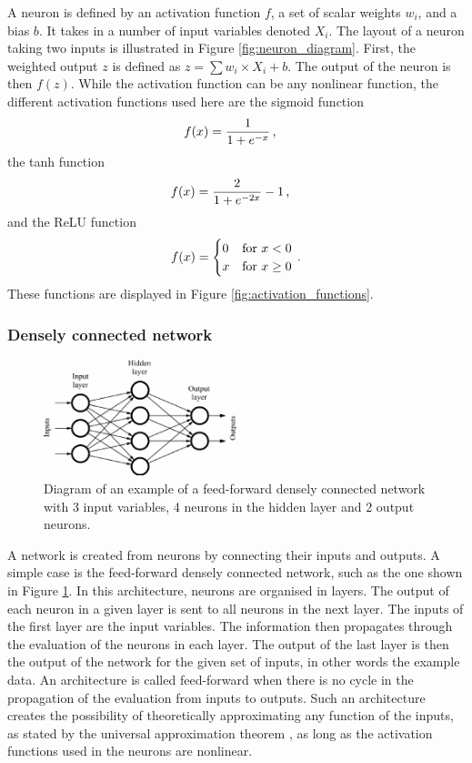 A neuron is defined by an activation function $f$, a set of scalar weights $w_i$, and a bias $b$. It takes in a number of input variables denoted $X_i$. The layout of a neuron taking two inputs is illustrated in Figure \ref{fig:neuron_diagram}. First, the weighted output $z$ is defined as $z = \sum w_i\times X_i + b$. The output of the neuron is then $f(z)$. While the activation function can be any nonlinear function, the different activation functions used here are the sigmoid function
\begin{equation}
    f(x) = \frac{1}{1+e^{-x}} \msep
\end{equation}
the tanh function
\begin{equation}
    f(x) = \frac{2}{1 + e^{-2x}} -1 \msep
\end{equation}
and the ReLU function
\begin{equation}
    f(x) = \begin{cases} 0 &\text{for $x < 0$} \\ x &\text{for $x \geq 0$} \end{cases} \mend
\end{equation}
These functions are displayed in Figure \ref{fig:activation_functions}.

\subsubsection{Densely connected network}


\begin{figure}
    \centering
    \includegraphics[width=0.5\textwidth]{Images/dense_network.png}
    \caption{Diagram of an example of a feed-forward densely connected network with 3 input variables, 4 neurons in the hidden layer and 2 output neurons.}
    \label{fig:dense_network}
\end{figure}

A network is created from neurons by connecting their inputs and outputs. A simple case is the feed-forward densely connected network, such as the one shown in Figure \ref{fig:dense_network}. In this architecture, neurons are organised in layers. The output of each neuron in a given layer is sent to all neurons in the next layer. The inputs of the first layer are the input variables. The information then propagates through the evaluation of the neurons in each layer. The output of the last layer is then the output of the network for the given set of inputs, in other words the example data. An architecture is called feed-forward when there is no cycle in the propagation of the evaluation from inputs to outputs. Such an architecture creates the possibility of theoretically approximating  any function of the inputs, as stated by the universal approximation theorem \cite{Cybenko1989}, as long as the activation functions used in the neurons are nonlinear.

